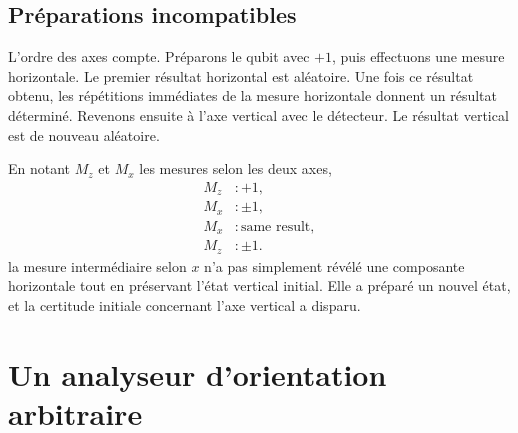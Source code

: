 \subsection{Préparations incompatibles}

L’ordre des axes compte. Préparons le qubit avec \(+1\), puis effectuons une mesure horizontale. Le premier résultat horizontal est aléatoire. Une fois ce résultat obtenu, les répétitions immédiates de la mesure horizontale donnent un résultat déterminé. Revenons ensuite à l’axe vertical avec le détecteur. Le résultat vertical est de nouveau aléatoire.

En notant \(M_z\) et \(M_x\) les mesures selon les deux axes,
\begin{equation}
\begin{aligned}
  M_z&:+1,\\
  M_x&:\pm1,\\
  M_x&:\text{same result},\\
  M_z&:\pm1.
\end{aligned}
\end{equation}
la mesure intermédiaire selon \(x\) n’a pas simplement révélé une composante horizontale tout en préservant l’état vertical initial. Elle a préparé un nouvel état, et la certitude initiale concernant l’axe vertical a disparu.

\begin{classroomqa}
\end{classroomqa}

\begin{classroomqa}
\end{classroomqa}

\section{Un analyseur d’orientation arbitraire}

